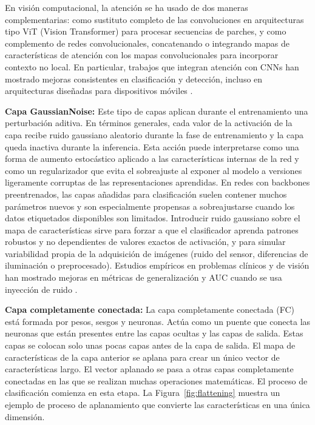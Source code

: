 En visión computacional, la atención se ha usado de dos maneras complementarias: como sustituto completo de las convoluciones en arquitecturas tipo ViT (Vision Transformer) para procesar secuencias de parches, y como complemento de redes convolucionales, concatenando o integrando mapas de características de atención con los mapas convolucionales para incorporar contexto no local. En particular, trabajos que integran atención con CNNs han mostrado mejoras consistentes en clasificación y detección, incluso en arquitecturas diseñadas para dispositivos móviles .

\textbf{Capa GaussianNoise:} Este tipo de capas aplican durante el entrenamiento una perturbación aditiva. En términos generales, cada valor de la activación de la capa recibe ruido gaussiano aleatorio durante la fase de entrenamiento y la capa queda inactiva durante la inferencia. Esta acción puede interpretarse como una forma de aumento estocástico aplicado a las características internas de la red y como un regularizador que evita el sobreajuste al exponer al modelo a versiones ligeramente corruptas de las representaciones aprendidas. En redes con backbones preentrenados, las capas añadidas para clasificación suelen contener muchos parámetros nuevos y son especialmente propensas a sobreajustarse cuando los datos etiquetados disponibles son limitados. Introducir ruido gaussiano sobre el mapa de características sirve para forzar a que el clasificador aprenda patrones robustos y no dependientes de valores exactos de activación, y para simular variabilidad propia de la adquisición de imágenes (ruido del sensor, diferencias de iluminación o preprocesado). Estudios empíricos en problemas clínicos y de visión han mostrado mejoras en métricas de generalización y AUC cuando se usa inyección de ruido .

\textbf{Capa completamente conectada:} La capa completamente conectada (FC) está formada por pesos, sesgos y neuronas. Actúa como un puente que conecta las neuronas que están presentes entre las capas ocultas y las capas de salida. Estas capas se colocan solo unas pocas capas antes de la capa de salida. El mapa de características de la capa anterior se aplana para crear un único vector de características largo. El vector aplanado se pasa a otras capas completamente conectadas en las que se realizan muchas operaciones matemáticas. El proceso de clasificación comienza en esta etapa. La Figura~\ref{fig:flattening} muestra un ejemplo de proceso de aplanamiento que convierte las características en una única dimensión.

